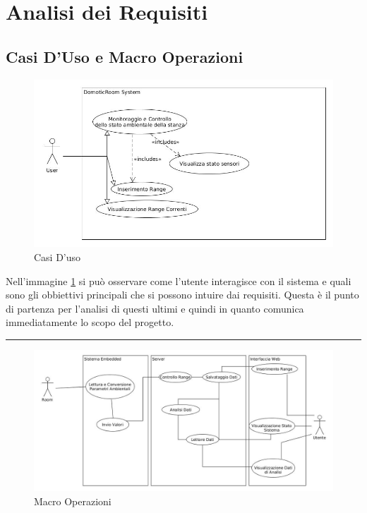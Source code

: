 \section{Analisi dei Requisiti}
\subsection{Casi D'Uso e Macro Operazioni}

\begin{figure}[ht]
\centering
\includegraphics[width=\textwidth]{Figures/UseCases}
\caption{Casi D'uso}
\label{useCases}
\end{figure}

Nell'immagine \ref{useCases} si pu\`o osservare come l'utente interagisce con il sistema e quali sono gli obbiettivi principali che si possono intuire dai requisiti. Questa \`e il punto di partenza per l'analisi di questi ultimi e quindi in quanto comunica immediatamente lo scopo del progetto.

\noindent\rule[0.5ex]{\linewidth}{1pt}

\begin{figure}[ht]
\centering
\includegraphics[width=\textwidth]{Figures/MacroOperations}
\caption{Macro Operazioni}
\label{macroOperation}
\end{figure}

